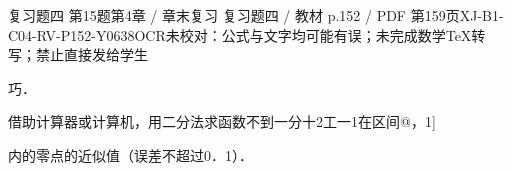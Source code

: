 \begin{bankitem}{复习题四 第15题}{第4章 / 章末复习 复习题四 / 教材 p.152 / PDF 第159页}{XJ-B1-C04-RV-P152-Y0638}{OCR未校对：公式与文字均可能有误；未完成数学TeX转写；禁止直接发给学生}
\begin{ocrdraft}
\par
巧．
\par
借助计算器或计算机，用二分法求函数不到一分十2工一1在区间@，1]
\par
内的零点的近似值（误差不超过0．1）．
\end{ocrdraft}
\end{bankitem}
